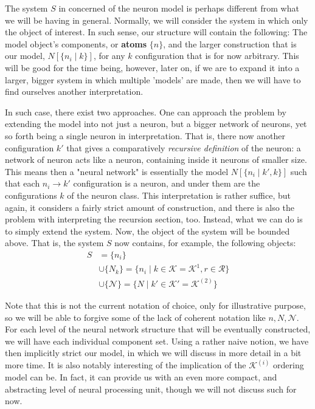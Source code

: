 The system $S$ in concerned of the neuron model is perhaps different from what we will be having in general. Normally, we will consider the system in which only the object of interest. In such sense, our structure will contain the following: The model object's components, or \textbf{atoms} $\{n\}$, and the larger construction that is our model, $N[\{n_{i}\mid k\}]$, for any $k$ configuration that is for now arbitrary. This will be good for the time being, however, later on, if we are to expand it into a larger, bigger system in which multiple 'models' are made, then we will have to find ourselves another interpretation. 

In such case, there exist two approaches. One can approach the problem by extending the model into not just a neuron, but a bigger network of neurons, yet so forth being a single neuron in interpretation. That is, there now another configuration $k'$ that gives a comparatively \textit{recursive definition} of the neuron: a network of neuron acts like a neuron, containing inside it neurons of smaller size. This means then a "neural network" is essentially the model $N[\{n_{i}\mid k',k\}]$ such that each $n_{i}\to k'$ configuration is a neuron, and under them are the configurations $k$ of the neuron class. This interpretation is rather suffice, but again, it considers a fairly strict amount of construction, and there is also the problem with interpreting the recursion section, too. Instead, what we can do is to simply extend the system. Now, the object of the system will be bounded above. That is, the system $S$ now contains, for example, the following objects: 
\begin{equation}
    \begin{split}
        S &=  \{n_{i}\} \\ 
        &\cup  \{N_{k}\} = \{n_{i}\mid k \in \mathcal{K} = \mathcal{K}^{1}, r\in \mathcal{R}\}\\
        &\cup \{\mathcal{N}\} = \{ N\mid k' \in \mathcal{K}' = \mathcal{K}^{(2)} \} 
    \end{split}
\end{equation}

Note that this is not the current notation of choice, only for illustrative purpose, so we will be able to forgive some of the lack of coherent notation like $n,N,\mathcal{N}$. For each level of the neural network structure that will be eventually constructed, we will have each individual component set. Using a rather naive notion, we have then implicitly strict our model, in which we will discuss in more detail in a bit more time. It is also notably interesting of the implication of the $\mathcal{K}^{(i)}$ ordering model can be. In fact, it can provide us with an even more compact, and abstracting level of neural processing unit, though we will not discuss such for now. 

